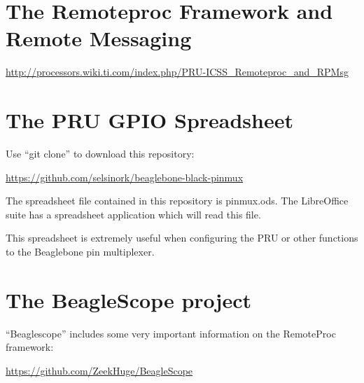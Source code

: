 \section{The Remoteproc Framework and Remote Messaging}

\url{http://processors.wiki.ti.com/index.php/PRU-ICSS_Remoteproc_and_RPMsg}

\section{The PRU GPIO Spreadsheet}

Use ``git clone'' to download this repository:

\url{https://github.com/selsinork/beaglebone-black-pinmux}

The spreadsheet file contained in this repository is pinmux.ods.
The LibreOffice suite has a spreadsheet application which will read
this file.

This spreadsheet is extremely useful when configuring the PRU or
other functions to the Beaglebone pin multiplexer.

\section{The BeagleScope project}

``Beaglescope'' includes some very important information on the RemoteProc framework:

\url{https://github.com/ZeekHuge/BeagleScope}
